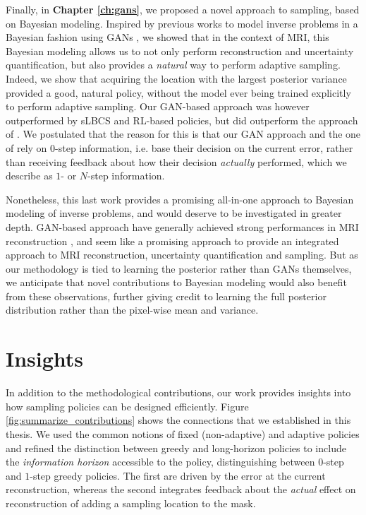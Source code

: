 Finally, in \textbf{Chapter \ref{ch:gans}}, we proposed a novel approach to sampling, based on Bayesian modeling. Inspired by previous works to model inverse problems in a Bayesian fashion using GANs \citep{adler2018deep}, we showed that in the context of MRI, this Bayesian modeling allows us to not only perform reconstruction and uncertainty quantification, but also provides a \textit{natural} way to perform adaptive sampling. Indeed, we show that acquiring the location with the largest posterior variance provided a good, natural policy, without the model ever being trained explicitly to perform adaptive sampling. Our GAN-based approach was however outperformed by sLBCS and RL-based policies, but did outperform the approach of \citet{zhang2019reducing}. We postulated that the reason for this is that our GAN approach and the one of \citet{zhang2019reducing} rely on $0$-step information, i.e. base their decision on the current error, rather than receiving feedback about how their decision \textit{actually} performed, which we describe as $1$- or $N$-step information. 

Nonetheless, this last work provides a promising all-in-one approach to Bayesian modeling of inverse problems, and would deserve to be investigated in greater depth. GAN-based approach have generally achieved strong performances in MRI reconstruction \citep{chen2022ai}, and seem like a promising approach to provide an integrated approach to MRI reconstruction, uncertainty quantification and sampling. But as our methodology is tied to learning the posterior rather than GANs themselves, we anticipate that novel contributions to Bayesian modeling would also benefit from these observations, further giving credit to learning the full posterior distribution rather than the pixel-wise mean and variance.

\section*{Insights}
In addition to the methodological contributions, our work provides insights into how sampling policies can be designed efficiently. Figure \ref{fig:summarize_contributions} shows the connections that we established in this thesis. We used the common notions of fixed (non-adaptive) and adaptive policies and refined the distinction between greedy and long-horizon policies to include the \textit{information horizon} accessible to the policy, distinguishing between $0$-step and $1$-step greedy policies. The first are driven by the error at the current reconstruction, whereas the second integrates feedback about the \textit{actual} effect on reconstruction of adding a sampling location to the mask. 

